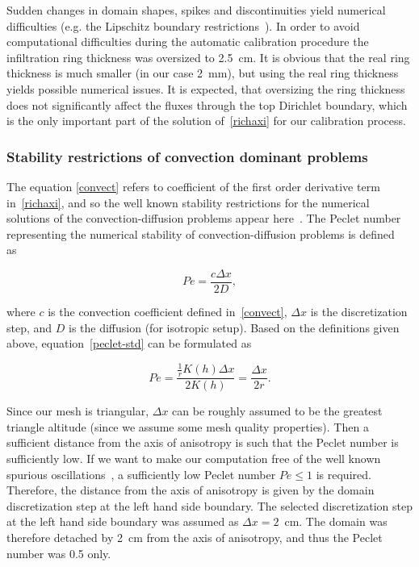 \documentclass[review,times,3p,twocolumn,10pt]{elsarticle}
\newenvironment{lineq}
    {\begin{linenomath*}
    \begin{equation}
    }
    { 
    \end{equation} 
    \end{linenomath*}
    }
\begin{document}
Sudden changes in domain shapes, spikes and discontinuities yield numerical difficulties (e.g. the Lipschitz boundary restrictions~\citep{braess}).
In order to avoid computational difficulties during the automatic calibration procedure the infiltration ring thickness was oversized  to 2.5~cm. It is obvious that the real ring thickness is much smaller (in our case 2~mm), but using the real ring thickness yields possible numerical issues.  It is expected, that oversizing the ring thickness does not significantly affect the fluxes through the top Dirichlet boundary, which is the only important part of the solution of~\eqref{richaxi} for our calibration process.


\subsubsection{Stability restrictions of convection dominant problems}
\label{restrconvect}

The equation \eqref{convect} refers to coefficient  of the first order derivative term in~\eqref{richaxi}, and so the well known stability restrictions for the numerical solutions of the convection-diffusion problems appear here~\cite{zienkiewicz1976}.
The Peclet number representing the numerical stability of convection-diffusion problems is defined as~\citep{knobloch2008} 
\begin{lineq}
\label{peclet-std}
Pe = \frac{c \Delta x}{2 D},
\end{lineq}
where $c$ is the convection coefficient defined in~\eqref{convect}, $\Delta x$ is the discretization step, and $D$ is the diffusion (for isotropic setup). Based on the definitions given above, equation~\eqref{peclet-std} can be formulated as
\begin{lineq}
Pe =  \frac{\frac{1}{r}K(h) \Delta x}{2K(h)} = \frac{\Delta x}{2r}.
\end{lineq}
Since our mesh is triangular, $\Delta x$ can be roughly assumed to be the greatest triangle altitude (since we assume some mesh quality properties). Then a sufficient distance from the axis of anisotropy is such that the Peclet number is sufficiently low. If we want to make our computation free of the well known spurious oscillations~\cite{zienkiewicz1976, roos-layers}, a sufficiently low Peclet number $Pe\le 1$ is required. Therefore, the distance from the axis of anisotropy is given by the domain discretization step at the left hand side boundary. The selected discretization step at the left hand side boundary was assumed as $\Delta x=2$~cm. The domain was therefore detached by 2~cm from the axis of anisotropy, and thus the Peclet number was 0.5 only.
\end{document}
